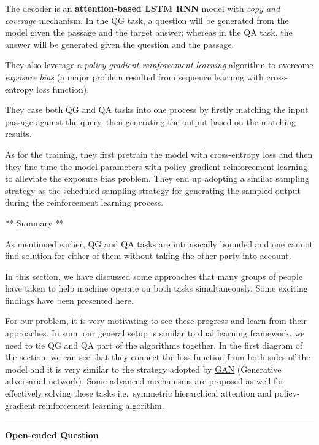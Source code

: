 \documentclass[]{book}
\theoremstyle{definition}
\theoremstyle{definition}
\theoremstyle{definition}
\theoremstyle{remark}
\begin{document}
The decoder is an \textbf{attention-based LSTM RNN} model with
\emph{copy and coverage} mechanism. In the QG task, a question will be
generated from the model given the passage and the target answer;
whereas in the QA task, the answer will be generated given the question
and the passage.

They also leverage a \emph{policy-gradient reinforcement learning}
algorithm to overcome \emph{exposure bias} (a major problem resulted
from sequence learning with cross-entropy loss function).

They case both QG and QA tasks into one process by firstly matching the
input passage against the query, then generating the output based on the
matching results.

As for the training, they first pretrain the model with cross-entropy
loss and then they fine tune the model parameters with policy-gradient
reinforcement learning to alleviate the exposure bias problem. They end
up adopting a similar sampling strategy as the scheduled sampling
strategy for generating the sampled output during the reinforcement
learning process.

** Summary **

As mentioned earlier, QG and QA tasks are intrinsically bounded and one
cannot find solution for either of them without taking the other party
into account.

In this section, we have discussed some approaches that many groups of
people have taken to help machine operate on both tasks simultaneously.
Some exciting findings have been presented here.

For our problem, it is very motivating to see these progress and learn
from their approaches. In sum, our general setup is similar to dual
learning framework, we need to tie QG and QA part of the algorithms
together. In the first diagram of the section, we can see that they
connect the loss function from both sides of the model and it is very
similar to the strategy adopted by
\href{https://en.wikipedia.org/wiki/Generative_adversarial_network}{GAN}
(Generative adversarial network). Some advanced mechanisms are proposed
as well for effectively solving these tasks i.e.~symmetric hierarchical
attention and policy-gradient reinforcement learning algorithm.

\begin{center}\rule{0.5\linewidth}{\linethickness}\end{center}

\textbf{Open-ended Question}
\end{document}
